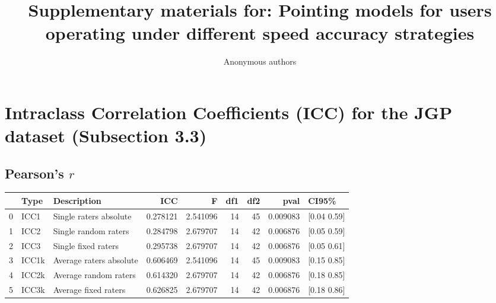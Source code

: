 \documentclass{article}
\title{Supplementary materials for: Pointing models for users operating under
different speed accuracy strategies }
\author{Anonymous authors}
\date{}
\begin{document}
\maketitle

\section{Intraclass Correlation Coefficients (ICC) for the JGP dataset (Subsection 3.3)}
\subsection{Pearson's $r$}
\begin{center}
    \begin{tabular}{lllrrrrrl}
        \toprule
          & Type  & Description             & ICC      & F        & df1 & df2 & pval     & CI95\%      \\
        \midrule
        0 & ICC1  & Single raters absolute  & 0.278121 & 2.541096 & 14  & 45  & 0.009083 & [0.04 0.59] \\
        1 & ICC2  & Single random raters    & 0.284798 & 2.679707 & 14  & 42  & 0.006876 & [0.05 0.59] \\
        2 & ICC3  & Single fixed raters     & 0.295738 & 2.679707 & 14  & 42  & 0.006876 & [0.05 0.61] \\
        3 & ICC1k & Average raters absolute & 0.606469 & 2.541096 & 14  & 45  & 0.009083 & [0.15 0.85] \\
        4 & ICC2k & Average random raters   & 0.614320 & 2.679707 & 14  & 42  & 0.006876 & [0.18 0.85] \\
        5 & ICC3k & Average fixed raters    & 0.626825 & 2.679707 & 14  & 42  & 0.006876 & [0.18 0.86] \\
        \bottomrule
    \end{tabular}
\end{center}
\end{document}
